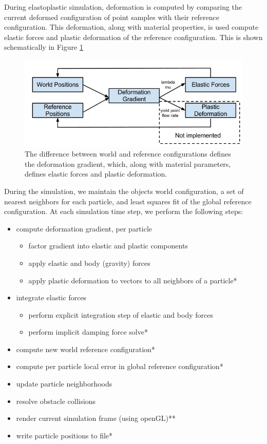 \documentclass[cameraready]{acmsiggraph-awb}
\begin{document}
During elastoplastic simulation, deformation is computed by comparing the current deformed configuration of point samples with their reference configuration.  This deformation, along with material properties, is used compute elastic forces and plastic deformation of the reference configuration.  This is shown schematically in Figure \ref{fig:defGrad}
\begin{figure}
\begin{centering}
\includegraphics[width = \textwidth]{Figures/algSchematic.png}
\caption{The difference between world and reference configurations defines the deformation gradient, which, along with material parameters, defines elastic forces and plastic deformation.}
\label{fig:defGrad}
\end{centering}
\end{figure}
During the simulation, we maintain the objects world configuration, a set of nearest neighbors for each particle, and least squares fit of the global reference configuration.  At each simulation time step, we perform the following steps:
\begin{itemize}

\item compute deformation gradient, per particle
\begin{itemize}
\item factor gradient into elastic and plastic components
\item apply elastic and body (gravity) forces
\item apply plastic deformation to vectors to all neighbors of a particle*
\end{itemize}
\item integrate elastic forces
\begin{itemize}
\item perform explicit integration step of elastic and body forces
\item perform implicit damping force solve* 
\end{itemize}
\item compute new world reference configuration* 
\item compute per particle local error in global reference configuration* 
\item update particle neighborhoods 
\item resolve obstacle collisions
\item render current simulation frame (using openGL)**
\item write particle positions to file*
\end{itemize}
\end{document}
